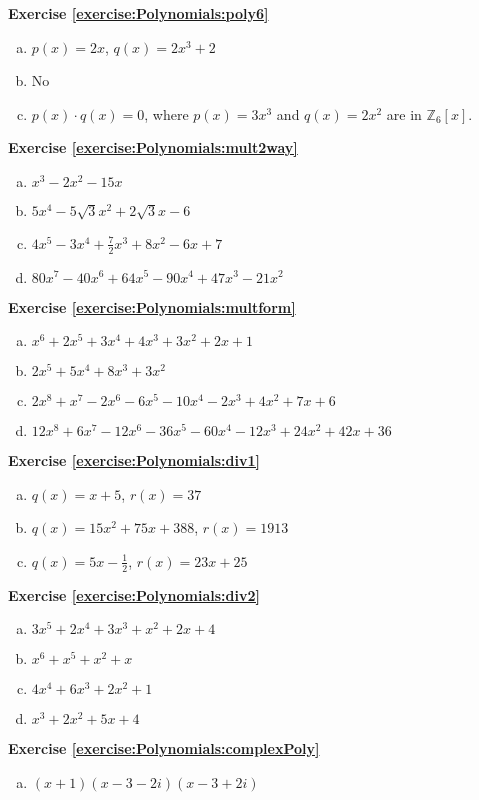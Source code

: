 \noindent\textbf{Exercise \ref{exercise:Polynomials:poly6}}
\begin{enumerate} [(a)]
\item
 $p(x)=2x$, $q(x)=2x^3+2$
\item 
No
\item
 $p(x) \cdot q(x)=0$, where $p(x)=3x^3$ and $q(x)=2x^2$ are in $\mathbb{Z}_6[x]$.
\end {enumerate}

\noindent\textbf{Exercise \ref{exercise:Polynomials:mult2way}}
\begin{enumerate} [(a)]
\item 
 $x^3-2x^2-15x$
\item
 $5x^4-5\sqrt{3}x^2+2\sqrt{3}x-6$
\item
$4x^5-3x^4+\frac{7}{2}x^3+8x^2-6x+7$
\item
$80x^7-40x^6+64x^5-90x^4+47x^3-21x^2$
\end {enumerate}

\noindent\textbf{Exercise \ref{exercise:Polynomials:multform}}
\begin{enumerate} [(a)]
\item 
 $x^6+2x^5+3x^4+4x^3+3x^2+2x+1$
\item
 $2x^5+5x^4+8x^3+3x^2$
\item
$2x^8+x^7-2x^6-6x^5-10x^4-2x^3+4x^2+7x+6$
\item
$12x^8+6x^7-12x^6-36x^5-60x^4-12x^3+24x^2+42x+36$
\end {enumerate}

\noindent\textbf{Exercise \ref{exercise:Polynomials:div1}}
\begin{enumerate} [(a)]
\item 
 $q(x)=x+5$, $r(x)=37$
\item
 $q(x)=15x^2+75x+388$, $r(x)=1913$
\item
$q(x)=5x-\frac{1}{2}$, $r(x)=23x+25$
\end {enumerate}

\noindent\textbf{Exercise \ref{exercise:Polynomials:div2}}
\begin{enumerate} [(a)]
\item
$3x^5 + 2x^4 + 3x^3 + x^2 +2x +4$
\item
$x^6 + x^5 + x^2 + x$
\item
$4x^4 + 6x^3 + 2x^2 + 1$
\item
$x^3+2x^2+5x+4$
\end {enumerate}

\noindent\textbf{Exercise \ref{exercise:Polynomials:complexPoly}}
\begin{enumerate} [(a)]
\item
$(x+1)(x-3-2i)(x-3+2i)$
\end {enumerate}





%
%
%
